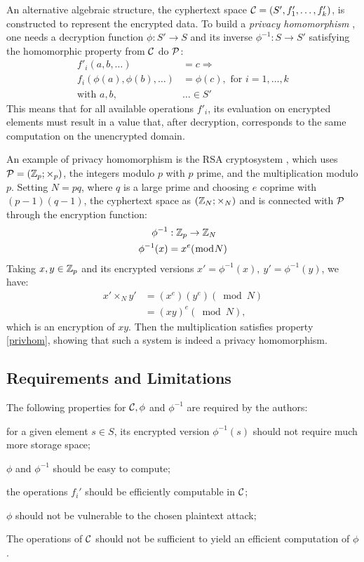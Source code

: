 An alternative algebraic structure, the cyphertext space $\mathcal C=(S',f'_1,\ldots,f'_k)$, is constructed to represent the encrypted data. To build a \textit{privacy homomorphism} \cite{Rivest1978},  one needs a decryption function $\phi:S'\to S$ and its inverse $\phi^{-1}:S\to S'$ satisfying the homomorphic property from $\mathcal C$ do $\mathcal P$:
\begin{align}
    \label{privhom}
    f'_i(a,b,\ldots)&=c\Rightarrow\nonumber\\ f_i(\phi(a),\phi(b),\ldots)&=\phi(c),\text{ for } i=1,\ldots,k\\
    \text{with }a,b,&\ldots\in S'\nonumber
\end{align}
This means that for all available operations $f'_i$, its evaluation on encrypted elements must result in a value that, after decryption, corresponds to the same computation on the unencrypted domain.

An example of privacy homomorphism is the RSA cryptosystem \cite{rsa}, which uses $\mathcal P = (\mathbb{Z}_p;\times_p)$, the integers modulo $p$ with $p$ prime, and the multiplication modulo $p$. Setting $N=pq$, where $q$ is a large prime and choosing $e$ coprime with $(p-1)(q-1)$,  the cyphertext space as $(\mathbb{Z}_N;\times_N)$ and is connected with $\mathcal P$ through the encryption function:
\begin{align*}
    \phi^{-1}&:\mathbb{Z}_p\to\mathbb{Z}_N\\
    \phi^{-1}(x)&=x^e(\bmod N)
\end{align*}
Taking $x,y\in\mathbb{Z}_p$ and its encrypted versions $x'=\phi^{-1}(x),~y'=\phi^{-1}(y)$, we have:
\begin{align*}
    x'\times_N y'&= (x^e)(y^e)(\bmod N)\\
    &=(xy)^e(\bmod N),
\end{align*}
which is an encryption of $xy$. Then the multiplication satisfies property \ref{privhom}, showing that such a system is indeed a privacy homomorphism.

\subsection{Requirements and Limitations}
The following properties for $\mathcal C,\phi$ and $\phi^{-1}$ are required by the authors:
\begin{alineas}
    \item for a given element $s\in S$, its encrypted version $\phi^{-1}(s)$ should not require much more storage space;
    \item $\phi$ and $\phi^{-1}$ should be easy to compute;
    \item the operations $f_i'$ should be efficiently computable in $\mathcal C$;
    \item $\phi$ should not be vulnerable to the chosen plaintext attack;
    \item The operations of $\mathcal C$ should not be sufficient to yield an efficient computation of $\phi$.
\end{alineas}

